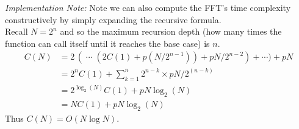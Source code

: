 




\noindent\textit{Implementation Note: }
Note we can also compute the FFT's time complexity constructively by simply expanding the recursive formula.\\

Recall $N = 2^n$ and so the maximum recursion depth (how many times the function can call itself until it reaches the base case) is $n$.
\begin{align*}
C(N) &= 2\,(\;\cdots\; (2C(1) + p(N/2^{n-1})) + pN/2^{n-2}) + \cdots ) + pN\\
     &= 2^{n}C(1) + \sum^n_{k=1} 2^{n-k} \times pN/2^{(n-k)}\\
     &= 2^{\log_2(N)}C(1) + pN\log_2(N)\\
     &= NC(1) + pN\log_2(N)
\end{align*}
Thus $C(N) = O(N \log N)$.

